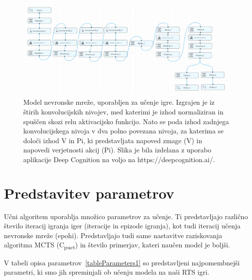 \documentclass[a4paper, 12pt]{book}
\begin{document}
\begin{figure}[h]
	\begin{center}
		\includegraphics[width=1\textwidth]{photos/model_using_deepcognition.pdf}
	\end{center}
	\caption{Model nevronske mreže, uporabljen za učenje igre. Izgrajen je iz štirih konvolucijskih nivojev, med katerimi je izhod normaliziran in spuščen skozi relu aktivacijsko funkcijo. Nato se poda izhod zadnjega konvolucijskega nivoja v dva polno povezana nivoja, za katerima se določi izhod V in Pi, ki predstavljata napoved zmage (V) in napovedi verjetnosti akcij (Pi).
		Slika je bila izdelana z uporabo aplikacije Deep Cognition na voljo na https://deepcognition.ai/.}
	\label{vizualzacijaModela}
\end{figure}



\section{Predstavitev parametrov}
\label{parametri}
Učni algoritem uporablja množico parametrov za učenje.
Ti predstavljajo različno število iteracij igranja iger (iteracije in epizode igranja), kot tudi iteracij učenja nevronske mreže (epohi).
Predstavljajo tudi same nastavitve raziskovanja algoritma MCTS (C\textsubscript{puct}) in število primerjav, kateri naučen model je boljši.

V tabeli opisa parametrov~\ref{tableParameters1} so predstavljeni najpomembnejši parametri, ki smo jih spreminjali ob učenju modela na naši RTS igri.
\end{document}
